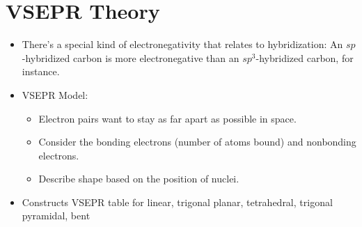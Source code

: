 \documentclass[../notes.tex]{subfiles}
\begin{document}
\section{VSEPR Theory}
\begin{itemize}
    \item {}There's a special kind of electronegativity that relates to hybridization: An $sp$-hybridized carbon is more electronegative than an $sp^3$-hybridized carbon, for instance.
    \item VSEPR Model:
    \begin{itemize}
        \item Electron pairs want to stay as far apart as possible in space.
        \item Consider the bonding electrons (number of atoms bound) and nonbonding electrons.
        \item Describe shape based on the position of nuclei.
    \end{itemize}
    \item Constructs VSEPR table for linear, trigonal planar, tetrahedral, trigonal pyramidal, bent
\end{itemize}
\end{document}
